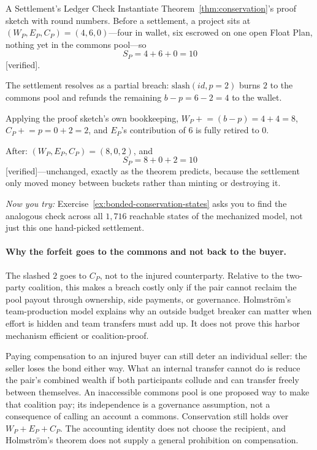 \documentclass[11pt,a4paper]{article}
\theoremstyle{definition}
\theoremstyle{remark}
\begin{document}
\begin{pdexample}{A Settlement's Ledger Check}
\setlength{\parskip}{4pt plus 1pt}
Instantiate Theorem~\ref{thm:conservation}'s proof sketch with round numbers. Before a settlement, a project sits at $(W_P, E_P, C_P) = (4, 6, 0)$---four in wallet, six escrowed on one open Float Plan, nothing yet in the commons pool---so \[
S_P = 4+6+0=10
\] [verified].

The settlement resolves as a partial breach: $\mathrm{slash}(\mathit{id}, p{=}2)$ burns $2$ to the commons pool and refunds the remaining $b-p=6-2=4$ to the wallet.

Applying the proof sketch's own bookkeeping, $W_P \mathrel{+}= (b-p) = 4+4=8$, $C_P \mathrel{+}= p = 0+2=2$, and $E_P$'s contribution of $6$ is fully retired to $0$.

After: $(W_P, E_P, C_P)=(8,0,2)$, and \[
S_P=8+0+2=10
\] [verified]---unchanged, exactly as the theorem predicts, because the settlement only moved money between buckets rather than minting or destroying it.

\emph{Now you try:} Exercise~\ref{ex:bonded-conservation-states} asks you to find the analogous check across all $1{,}716$ reachable states of the mechanized model, not just this one hand-picked settlement.
\end{pdexample}

\paragraph{Why the forfeit goes to the commons and not back to the buyer.}
The slashed $2$ goes to $C_P$, not to the injured counterparty. Relative to the
two-party coalition, this makes a breach costly only if the pair cannot reclaim
the pool payout through ownership, side payments, or governance.
Holmström's team-production model  explains why an outside
budget breaker can matter when effort is hidden and team transfers must add up.
It does not prove this harbor mechanism efficient or coalition-proof.

Paying compensation to an injured buyer can still deter an individual seller:
the seller loses the bond either way. What an internal transfer cannot do is
reduce the pair's combined wealth if both participants collude and can transfer
freely between themselves. An inaccessible commons pool is one proposed way to
make that coalition pay; its independence is a governance assumption, not a
consequence of calling an account a commons. Conservation still holds over
$W_P+E_P+C_P$. The accounting identity does not choose the recipient, and
Holmström's theorem does not supply a general prohibition on compensation.
\end{document}
